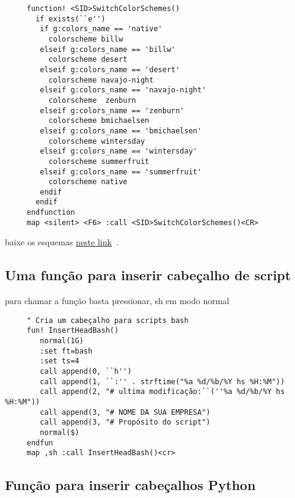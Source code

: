 \begin{verbatim}
     function! <SID>SwitchColorSchemes()
       if exists(``e'')
        if g:colors_name == 'native'
          colorscheme billw
        elseif g:colors_name == 'billw'
          colorscheme desert
        elseif g:colors_name == 'desert'
          colorscheme navajo-night
        elseif g:colors_name == 'navajo-night'
          colorscheme  zenburn
        elseif g:colors_name == 'zenburn'
          colorscheme bmichaelsen
        elseif g:colors_name == 'bmichaelsen'
          colorscheme wintersday
        elseif g:colors_name == 'wintersday'
          colorscheme summerfruit
        elseif g:colors_name == 'summerfruit'
          colorscheme native
        endif
       endif
     endfunction
     map <silent> <F6> :call <SID>SwitchColorSchemes()<CR>
\end{verbatim}

baixe os esquemas 
\href{http://nanasi.jp/old/colorscheme\_0.html}{neste link}~\cite{EsquemasDeCor}.

\subsection{Uma função para inserir cabeçalho de script}
\label{Uma função para inserir cabeçalho de script bash}
para chamar a função
basta pressionar, sh em modo normal

\begin{verbatim}
     " Cria um cabeçalho para scripts bash
     fun! InsertHeadBash()
        normal(1G)
        :set ft=bash
        :set ts=4
        call append(0, ``h'')
        call append(1, ``:'' . strftime("%a %d/%b/%Y hs %H:%M"))
        call append(2, "# ultima modificação:``(''%a %d/%b/%Y hs %H:%M"))
        call append(3, "# NOME DA SUA EMPRESA")
        call append(3, "# Propósito do script")
        normal($)
     endfun
     map ,sh :call InsertHeadBash()<cr>
\end{verbatim}

\subsection{Função para inserir cabeçalhos Python}
\label{Função para inserir cabeçalhos Python}

